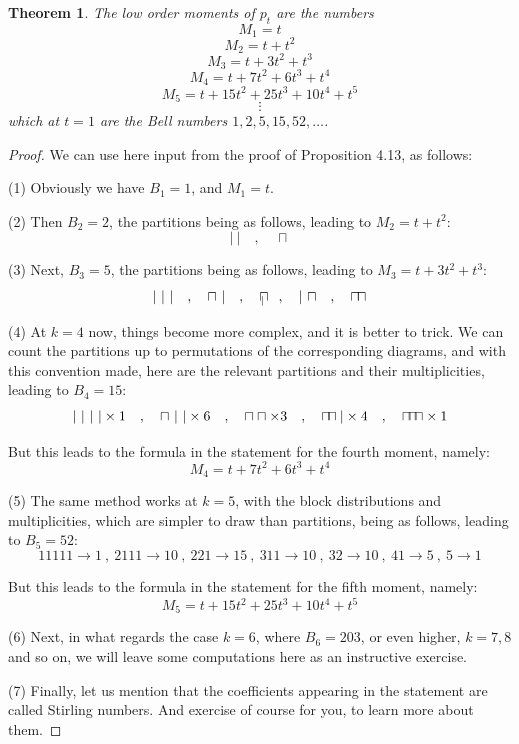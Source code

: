 \documentclass[12pt]{amsbook}
\newtheorem{theorem}{Theorem}[chapter]
\begin{document}
\begin{theorem}
The low order moments of $p_t$ are the numbers
$$M_1=t$$
$$M_2=t+t^2$$
$$M_3=t+3t^2+t^3$$
$$M_4=t+7t^2+6t^3+t^4$$
$$M_5=t+15t^2+25t^3+10t^4+t^5$$
$$\vdots$$
which at $t=1$ are the Bell numbers $1,2,5,15,52,\ldots$.
\end{theorem}

\begin{proof}
We can use here input from the proof of Proposition 4.13, as follows:

\medskip

(1) Obviously we have $B_1=1$, and $M_1=t$.

\medskip

(2) Then $B_2=2$, the partitions being as follows, leading to $M_2=t+t^2$:
$$|\ |\quad,\quad\sqcap$$

(3) Next, $B_3=5$, the partitions being as follows, leading to $M_3=t+3t^2+t^3$:
$$|\ |\ |\quad,\quad\sqcap\ |\quad,\quad\sqcap\hskip-3.2mm{\ }_|\quad,\quad|\ \sqcap\quad,\quad\sqcap\hskip-0.7mm\sqcap$$

(4) At $k=4$ now, things become more complex, and it is better to trick. We can count the partitions up to permutations of the corresponding diagrams, and with this convention made, here are the relevant partitions and their multiplicities, leading to $B_4=15$:
$$|\ |\ |\ |\times1\quad,\quad \sqcap\ |\ |\times 6\quad,\quad \sqcap\sqcap\times 3
\quad,\quad \sqcap\hskip-1.6mm\sqcap|\times4\quad,\quad \sqcap\hskip-1.6mm\sqcap\hskip-1.6mm\sqcap\times1$$

But this leads to the formula in the statement for the fourth moment, namely:
$$M_4=t+7t^2+6t^3+t^4$$

(5) The same method works at $k=5$, with the block distributions and multiplicities, which are simpler to draw than partitions, being as follows, leading to $B_5=52$:
$$11111\to1\ ,\ 2111\to10\ ,\ 221\to15\ ,\ 311\to10\ ,\ 32\to10\ ,\ 41\to5\ ,\ 5\to1$$

But this leads to the formula in the statement for the fifth moment, namely:
$$M_5=t+15t^2+25t^3+10t^4+t^5$$

(6) Next, in what regards the case $k=6$, where $B_6=203$, or even higher, $k=7,8$ and so on, we will leave some computations here as an instructive exercise.

\medskip

(7) Finally, let us mention that the coefficients appearing in the statement are called Stirling numbers. And exercise of course for you, to learn more about them.
\end{proof}
\end{document}
